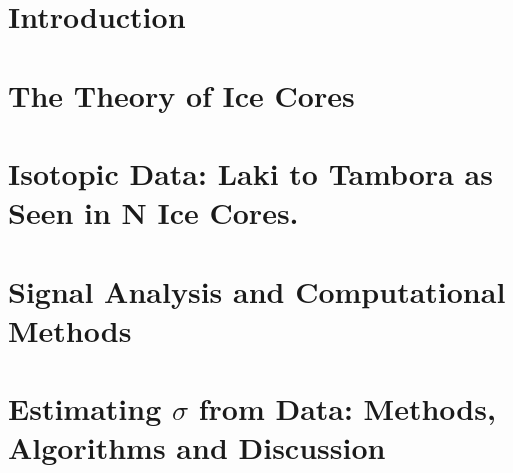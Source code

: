 \documentclass[11pt]{memoir} %
\begin{document}
\newpage


\tableofcontents*{}


\newpage
\listoffigures

\listoftables

\lstlistoflistings


\mainmatter

\chapter[Introduction][Introduction]{Introduction}




\chapter[Ice Theory][Ice Theory]{The Theory of Ice Cores}




\chapter[Data][Data]{Isotopic Data: Laki to Tambora as Seen in N Ice Cores.}





\chapter[Signal Analysis \& Comp. Meth.][Signal Analysis \& Comp. Meth.]{Signal Analysis and Computational Methods}





%


\chapter[Method and Discussion][Method and Discussion]{Estimating $\sigma$ from Data: Methods, Algorithms and Discussion}
\end{document}
